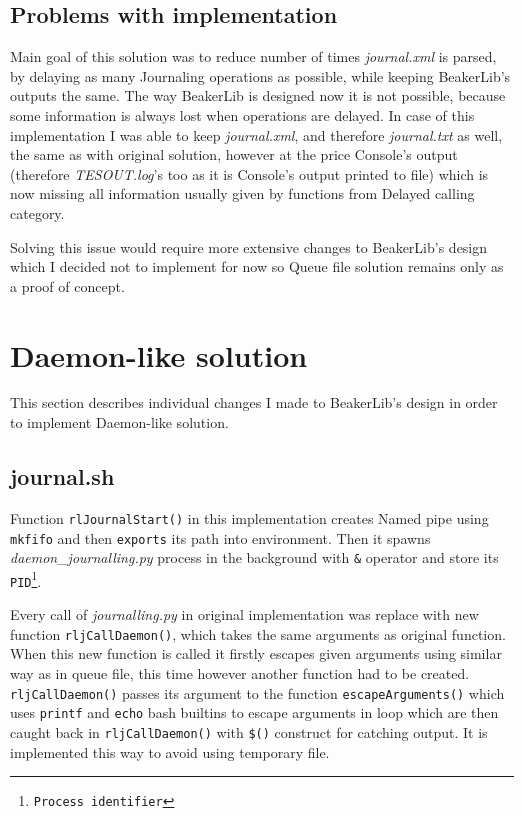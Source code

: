 \subsection{Problems with implementation}
Main goal of this solution was to reduce number of times \textit{journal.xml} is parsed, by delaying as many Journaling operations as possible, while keeping BeakerLib's outputs the same. The way BeakerLib is designed now it is not possible, because some information is always lost when operations are delayed. In case of this implementation I was able to keep \textit{journal.xml}, and therefore \textit{journal.txt}  as well, the same as with original solution, however at the price Console's output (therefore \textit{TESOUT.log}'s too as it is Console's output printed to file) which is now missing all information usually given by functions from Delayed calling category. 

Solving this issue would require more extensive changes to BeakerLib's design which I decided not to implement for now so Queue file solution remains only as a proof of concept.

\section{Daemon-like solution}
This section describes individual changes I made to BeakerLib's design in order to implement Daemon-like solution.

\subsection{journal.sh}
Function \texttt{rlJournalStart()} in this implementation creates Named pipe using \texttt{mkfifo} and then \texttt{exports} its path into environment.
Then it spawns \textit{daemon\_journalling.py} process in the background with \texttt{\&} operator and store its \texttt{PID\footnote{Process identifier}}.

Every call of \textit{journalling.py} in original implementation was replace with new function \texttt{rljCallDaemon()}, which takes the same arguments as original function. When this new function is called it firstly escapes given arguments using similar way as in queue file, this time however another function had to be created.  \texttt{rljCallDaemon()} passes its argument to the function \texttt{escapeArguments()} which uses \texttt{printf} and \texttt{echo} bash builtins to escape arguments in loop which are then caught back in \texttt{rljCallDaemon()} with \texttt{\$()} construct\cite{command_substitution} for catching output. It is implemented this way to avoid using temporary file.

